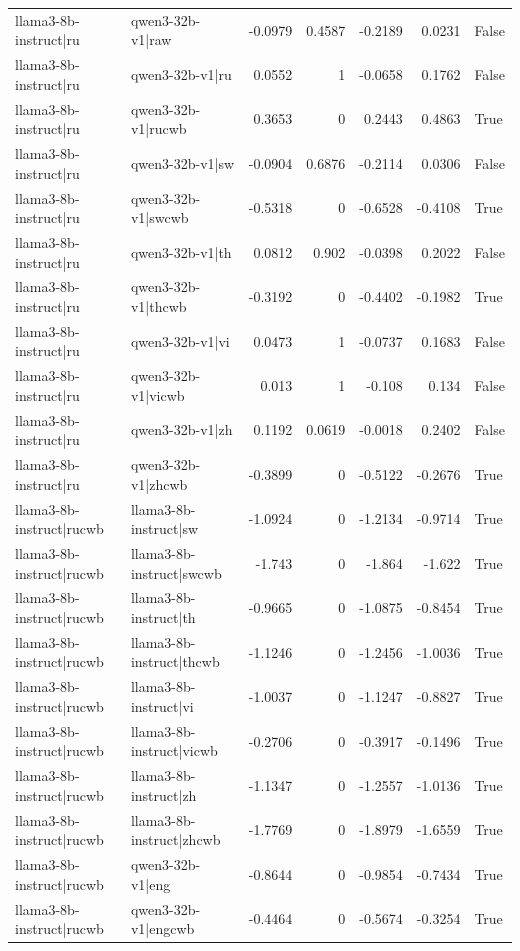 \begin{table}
\begin{tabular}{l l r r r r l}
llama3-8b-instruct|ru & qwen3-32b-v1|raw & -0.0979 & 0.4587 & -0.2189 & 0.0231 & False \\
llama3-8b-instruct|ru & qwen3-32b-v1|ru & 0.0552 & 1 & -0.0658 & 0.1762 & False \\
llama3-8b-instruct|ru & qwen3-32b-v1|rucwb & 0.3653 & 0 & 0.2443 & 0.4863 & True \\
llama3-8b-instruct|ru & qwen3-32b-v1|sw & -0.0904 & 0.6876 & -0.2114 & 0.0306 & False \\
llama3-8b-instruct|ru & qwen3-32b-v1|swcwb & -0.5318 & 0 & -0.6528 & -0.4108 & True \\
llama3-8b-instruct|ru & qwen3-32b-v1|th & 0.0812 & 0.902 & -0.0398 & 0.2022 & False \\
llama3-8b-instruct|ru & qwen3-32b-v1|thcwb & -0.3192 & 0 & -0.4402 & -0.1982 & True \\
llama3-8b-instruct|ru & qwen3-32b-v1|vi & 0.0473 & 1 & -0.0737 & 0.1683 & False \\
llama3-8b-instruct|ru & qwen3-32b-v1|vicwb & 0.013 & 1 & -0.108 & 0.134 & False \\
llama3-8b-instruct|ru & qwen3-32b-v1|zh & 0.1192 & 0.0619 & -0.0018 & 0.2402 & False \\
llama3-8b-instruct|ru & qwen3-32b-v1|zhcwb & -0.3899 & 0 & -0.5122 & -0.2676 & True \\
llama3-8b-instruct|rucwb & llama3-8b-instruct|sw & -1.0924 & 0 & -1.2134 & -0.9714 & True \\
llama3-8b-instruct|rucwb & llama3-8b-instruct|swcwb & -1.743 & 0 & -1.864 & -1.622 & True \\
llama3-8b-instruct|rucwb & llama3-8b-instruct|th & -0.9665 & 0 & -1.0875 & -0.8454 & True \\
llama3-8b-instruct|rucwb & llama3-8b-instruct|thcwb & -1.1246 & 0 & -1.2456 & -1.0036 & True \\
llama3-8b-instruct|rucwb & llama3-8b-instruct|vi & -1.0037 & 0 & -1.1247 & -0.8827 & True \\
llama3-8b-instruct|rucwb & llama3-8b-instruct|vicwb & -0.2706 & 0 & -0.3917 & -0.1496 & True \\
llama3-8b-instruct|rucwb & llama3-8b-instruct|zh & -1.1347 & 0 & -1.2557 & -1.0136 & True \\
llama3-8b-instruct|rucwb & llama3-8b-instruct|zhcwb & -1.7769 & 0 & -1.8979 & -1.6559 & True \\
llama3-8b-instruct|rucwb & qwen3-32b-v1|eng & -0.8644 & 0 & -0.9854 & -0.7434 & True \\
llama3-8b-instruct|rucwb & qwen3-32b-v1|engcwb & -0.4464 & 0 & -0.5674 & -0.3254 & True \\

\end{tabular}
\end{table}
